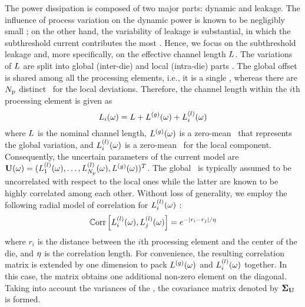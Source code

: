 The power dissipation is composed of two major parts: dynamic and leakage. The influence of process variation on the dynamic power is known to be negligibly small \cite{juan2011, juan2012, srivastava2010}; on the other hand, the variability of leakage is substantial, in which the subthreshold current contributes the most \cite{juan2011, juan2012}. Hence, we focus on the subthreshold leakage and, more specifically, on the effective channel length $L$. The variations of $L$ are split into global (inter-die) and local (intra-die) parts \cite{chandra2010, juan2011, juan2012, srivastava2010, shen2009}. The global offset is shared among all the processing elements, i.e., it is a single \rv, whereas there are ${N_\text{p}}$ distinct \rvs\ for the local deviations. Therefore, the channel length within the $i$th processing element is given as
\[
  L_i(\omega) = L + {L^{(g)}}(\omega) + L^{(l)}_i(\omega)
\]
where $L$ is the nominal channel length, ${L^{(g)}}(\omega)$ is a zero-mean \rv\ that represents the global variation, and $L^{(l)}_i(\omega)$ is a zero-mean \rv\ for the local component. Consequently, the uncertain parameters of the current model are $\mathbf{U}(\omega) = (L^{(l)}_1(\omega), \dotsc, L^{(l)}_{N_\text{p}}(\omega), {L^{(g)}}(\omega) )^T$. The global \rv\ is typically assumed to be uncorrelated with respect to the local ones while the latter are known to be highly correlated among each other. Without loss of generality, we employ the following radial model of correlation for $L^{(l)}_i(\omega)$ \cite{ghanem1991, cheng2011}:
\begin{equation} \elabel{correlation-matrix}
  \oCorr{\lLeff_i(\o), \lLeff_j(\o)} = e^{-|r_i - r_j|/\corrLength}
\end{equation}
where $r_i$ is the distance between the $i$th processing element and the center of the die, and $\eta$ is the correlation length. For convenience, the resulting correlation matrix is extended by one dimension to pack ${L^{(g)}}(\omega)$ and $L^{(l)}_i(\omega)$ together. In this case, the matrix obtains one additional non-zero element on the diagonal. Taking into account the variances of the \rvs, the covariance matrix denoted by $\mCov_\vU$ is formed.

